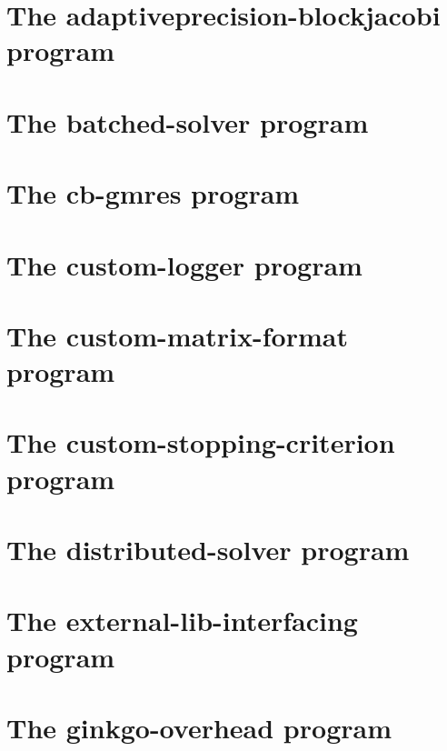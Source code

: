 \let\mypdfximage\pdfximage\def\pdfximage{\immediate\mypdfximage}\documentclass[twoside]{book}
\newcommand{\+}{\discretionary{\mbox{\scriptsize$\hookleftarrow$}}{}{}}
\begin{document}
\chapter{The adaptiveprecision-\/blockjacobi program}
\label{adaptiveprecision_blockjacobi}

\chapter{The batched-\/solver program}
\label{batched_solver}

\chapter{The cb-\/gmres program}
\label{cb_gmres}

\chapter{The custom-\/logger program}
\label{custom_logger}

\chapter{The custom-\/matrix-\/format program}
\label{custom_matrix_format}

\chapter{The custom-\/stopping-\/criterion program}
\label{custom_stopping_criterion}

\chapter{The distributed-\/solver program}
\label{distributed_solver}

\chapter{The external-\/lib-\/interfacing program}
\label{external_lib_interfacing}

\chapter{The ginkgo-\/overhead program}
\label{ginkgo_overhead}

\end{document}
